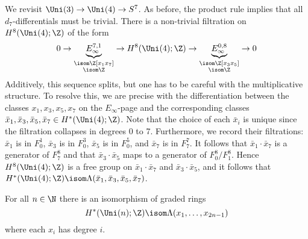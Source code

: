 \begin{example}
	We revisit $\Uni(3) \to \Uni(4) \to S^7$.
	As before, the product rule implies that all $d_7$-differentials must be trivial.
	There is a non-trivial filtration on $H^8(\Uni(4); \Z)$ of the form
	\begin{equation*}
		0 \to \underbrace{E_\infty^{7, 1}}_{\substack{\isom \Z[x_1 x_7] \\ \isom \Z}} \to H^8(\Uni(4); \Z) \to \underbrace{E_\infty^{0, 8}}_{\substack{\isom \Z[x_3 x_5] \\ \isom \Z}} \to 0
	\end{equation*}
	Additively, this sequence splits, but one has to be careful with the multiplicative structure.
	To resolve this, we are precise with the differentiation between the classes $x_1, x_3, x_5, x_7$ on the $E_\infty$-page and the corresponding classes $\bar{x}_1, \bar{x}_3, \bar{x}_5, \bar{x}_7 \in H^*(\Uni(4); \Z)$.
	Note that the choice of each $\bar{x}_i$ is unique since the filtration collapses in degrees 0 to 7.
	Furthermore, we record their filtrations: $\bar{x}_1$ is in $F^1_0$, $\bar{x}_3$ is in $F^3_0$, $\bar{x}_5$ is in $F^5_0$, and $\bar{x}_7$ is in $F^7_7$.
	It follows that $\bar{x}_1 \cdot \bar{x}_7$ is a generator of $F^8_7$ and that $\bar{x}_3 \cdot \bar{x}_5$ maps to a generator of $F^8_0 / F^8_1$.
	Hence $H^8(\Uni(4); \Z)$ is a free group on $\bar{x}_1 \cdot \bar{x}_7$ and $\bar{x}_3 \cdot \bar{x}_5$, and it follows that $H^*(\Uni(4); \Z) \isom \Lambda(\bar{x}_1, \bar{x}_3, \bar{x}_5, \bar{x}_7)$.
\end{example}
\begin{theorem}
	For all $n \in \N$ there is an isomorphism of graded rings
	\begin{equation*}
		H^*(\Uni(n); \Z) \isom \Lambda(x_1, \ldots, x_{2n - 1})
	\end{equation*}
	where each $x_i$ has degree $i$.
\end{theorem}
